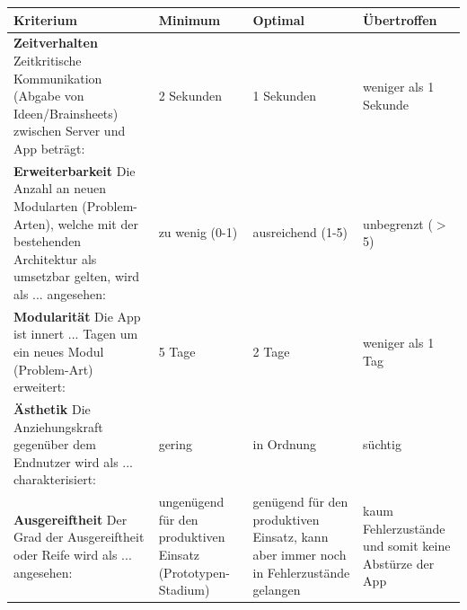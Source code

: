 \begin{center}
    \begin{tabular}{ | p{6cm} | p{2.5cm} | p{2.5cm} | p{2.5cm} |}
    	\hline
    Kriterium & Minimum & Optimal & Übertroffen \\ 
    	\hline
    \textbf{Zeitverhalten} \newline Zeitkritische Kommunikation (Abgabe von Ideen/Brainsheets) zwischen Server und App beträgt: & 2 Sekunden & 1 Sekunden & weniger als 1 Sekunde \\
    	\hline
    \textbf{Erweiterbarkeit} \newline Die Anzahl an neuen Modularten (Problem-Arten), welche mit der bestehenden Architektur als umsetzbar gelten, wird als ... angesehen: & zu wenig (0-1) & ausreichend (1-5) & unbegrenzt ($>$5)\\
    	\hline
    \textbf{Modularität} \newline Die App ist innert ... Tagen um ein neues Modul (Problem-Art) erweitert: & 5 Tage & 2 Tage & weniger als 1 Tag \\
    	\hline
    \textbf{Ästhetik} \newline Die Anziehungskraft gegenüber dem Endnutzer wird als ... charakterisiert: & gering & in Ordnung & süchtig \\
    	\hline
    \textbf{Ausgereiftheit} \newline Der Grad der Ausgereiftheit oder Reife wird als ... angesehen: & ungenügend für den produktiven Einsatz (Prototypen-Stadium) & genügend für den produktiven Einsatz, kann aber immer noch in Fehlerzustände gelangen & kaum Fehlerzustände und somit keine Abstürze der App  \\
    	\hline
    \end{tabular}
\end{center}
